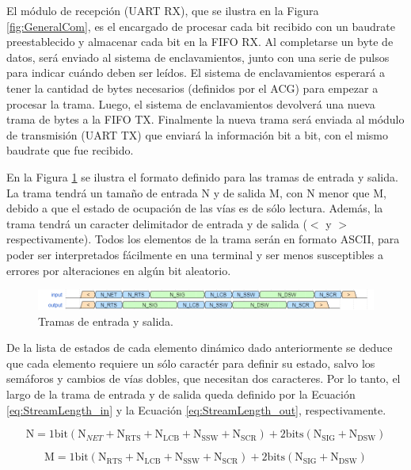 	El módulo de recepción (UART RX), que se ilustra en la Figura \ref{fig:GeneralCom}, es el encargado de procesar cada bit recibido con un baudrate preestablecido y almacenar cada bit en la FIFO RX. Al completarse un byte de datos, será enviado al sistema de enclavamientos, junto con una serie de pulsos para indicar cuándo deben ser leídos. El sistema de enclavamientos esperará a tener la cantidad de bytes necesarios (definidos por el ACG) para empezar a procesar la trama. Luego, el sistema de enclavamientos devolverá una nueva trama de bytes a la FIFO TX. Finalmente la nueva trama será enviada al módulo de transmisión (UART TX) que enviará la información bit a bit, con el mismo baudrate que fue recibido.
		
	En la Figura \ref{fig:Stream} se ilustra el formato definido para las tramas de entrada y salida. La trama tendrá un tamaño de entrada N y de salida M, con N menor que M, debido a que el estado de ocupación de las vías es de sólo lectura. Además, la trama tendrá un caracter delimitador de entrada y de salida ($<$ y $>$ respectivamente). Todos los elementos de la trama serán en formato ASCII, para poder ser interpretados fácilmente en una terminal y ser menos susceptibles a errores por alteraciones en algún bit aleatorio.
	
	\begin{figure}[H]
		\centering
		\includegraphics[width=1\textwidth]{Figuras/Tramas.png}
		\centering\caption{Tramas de entrada y salida.}
		\label{fig:Stream}
	\end{figure}
	
	De la lista de estados de cada elemento dinámico dado anteriormente se deduce que cada elemento requiere un sólo caractér para definir su estado, salvo los semáforos y cambios de vías dobles, que necesitan dos caracteres. Por lo tanto, el largo de la trama de entrada y de salida queda definido por la Ecuación \ref{eq:StreamLength_in} y la Ecuación \ref{eq:StreamLength_out}, respectivamente.
	
	\begin{equation} 
		\label{eq:StreamLength_in}
		\text{N} = 1\text{bit} (\text{N}_{NET}+\text{N}_{\text{RTS}}+\text{N}_{\text{LCB}}+\text{N}_{\text{SSW}}+\text{N}_{\text{SCR}})+2\text{bits} (\text{N}_{\text{SIG}}+\text{N}_{\text{DSW}})
	\end{equation}
	
	\begin{equation} 
		\label{eq:StreamLength_out}
		\text{M} = 1\text{bit} (\text{N}_{\text{RTS}}+\text{N}_{\text{LCB}}+\text{N}_{\text{SSW}}+\text{N}_{\text{SCR}})+2\text{bits} (\text{N}_{\text{SIG}}+\text{N}_{\text{DSW}})
	\end{equation}
	
